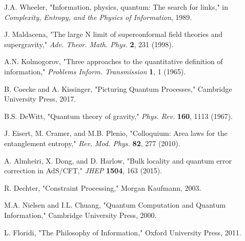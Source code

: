 \documentclass[11pt]{article}
\theoremstyle{definition}
\begin{document}

\begin{thebibliography}{99}

 J.A. Wheeler, "Information, physics, quantum: The search for links," in \emph{Complexity, Entropy, and the Physics of Information}, 1989.

 J. Maldacena, "The large N limit of superconformal field theories and supergravity," \emph{Adv. Theor. Math. Phys.} \textbf{2}, 231 (1998).

 A.N. Kolmogorov, "Three approaches to the quantitative definition of information," \emph{Problems Inform. Transmission} \textbf{1}, 1 (1965).

 B. Coecke and A. Kissinger, "Picturing Quantum Processes," Cambridge University Press, 2017.

 B.S. DeWitt, "Quantum theory of gravity," \emph{Phys. Rev.} \textbf{160}, 1113 (1967).

 J. Eisert, M. Cramer, and M.B. Plenio, "Colloquium: Area laws for the entanglement entropy," \emph{Rev. Mod. Phys.} \textbf{82}, 277 (2010).

 A. Almheiri, X. Dong, and D. Harlow, "Bulk locality and quantum error correction in AdS/CFT," \emph{JHEP} \textbf{1504}, 163 (2015).

 R. Dechter, "Constraint Processing," Morgan Kaufmann, 2003.

 M.A. Nielsen and I.L. Chuang, "Quantum Computation and Quantum Information," Cambridge University Press, 2000.

 L. Floridi, "The Philosophy of Information," Oxford University Press, 2011.

\end{thebibliography}
\end{document}
